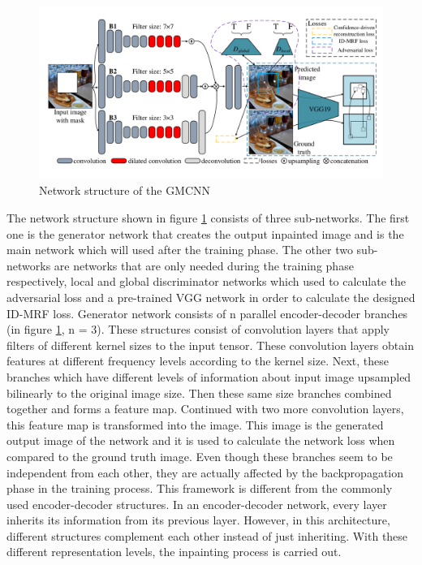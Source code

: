 \begin{figure}[h]
    \centering
    \includegraphics[width=14cm]{figures/chapter4/gmcnn.png}
    \caption{Network structure of the GMCNN \cite{inpainting_via_multi_cnn}}
    \label{fig:gmcnn}
\end{figure}

The network structure shown in figure \ref{fig:gmcnn} consists of three sub-networks. The first one is the generator network that creates the output inpainted image and is the main network which will used after the training phase. The other two sub-networks are networks that are only needed during the training phase respectively, local and global discriminator networks which used to calculate the adversarial loss and a pre-trained VGG network \cite{very_deep_conv} in order to calculate the designed ID-MRF loss. Generator network consists of n parallel encoder-decoder branches (in figure \ref{fig:gmcnn}, n = 3). These structures consist of convolution layers that apply filters of different kernel sizes to the input tensor. These convolution layers obtain features at different frequency levels according to the kernel size. Next, these branches which have different levels of information about input image upsampled bilinearly to the original image size. Then these same size branches combined together and forms a feature map. Continued with two more convolution layers, this feature map is transformed into the image. This image is the generated output image of the network and it is used to calculate the network loss when compared to the ground truth image. Even though these branches seem to be independent from each other, they are actually affected by the backpropagation phase in the training process. This framework is different from the commonly used encoder-decoder structures. In an encoder-decoder network, every layer inherits its information from its previous layer. However, in this architecture, different structures complement each other instead of just inheriting. With these different representation levels, the inpainting process is carried out.

